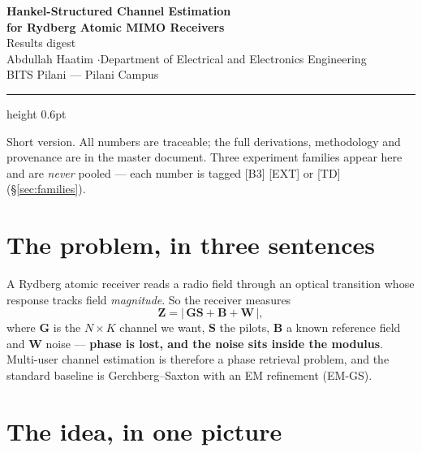 \documentclass[11pt]{article}
\newcommand{\famtag}[1]{{\footnotesize\textcolor{tag}{[#1]}}}
\newcommand{\bG}{\mathbf{G}}
\newcommand{\bS}{\mathbf{S}}
\newcommand{\bB}{\mathbf{B}}
\newcommand{\bW}{\mathbf{W}}
\newcommand{\bZ}{\mathbf{Z}}
\begin{document}
\begin{center}
{\LARGE\bfseries Hankel-Structured Channel Estimation}\\[3pt]
{\LARGE\bfseries for Rydberg Atomic MIMO Receivers}\\[8pt]
{\large Results digest}\\[6pt]
{\normalsize Abdullah Haatim \quad$\cdot$\quad Department of Electrical and
Electronics Engineering}\\
{\normalsize BITS Pilani --- Pilani Campus}
\end{center}

\vspace{2pt}
\hrule height 0.6pt
\vspace{10pt}

{\small
Short version. All numbers are traceable; the full derivations, methodology and
provenance are in the master document. Three experiment families appear here
and are \emph{never} pooled --- each number is tagged \famtag{B3} \famtag{EXT} or
\famtag{TD} (\S\ref{sec:families}).
\par}

\vspace{6pt}

\section{The problem, in three sentences}

A Rydberg atomic receiver reads a radio field through an optical transition
whose response tracks field \emph{magnitude}. So the receiver measures
\begin{equation*}
\bZ = \bigl|\,\bG\bS + \bB + \bW\,\bigr|,
\end{equation*}
where $\bG$ is the $N\times K$ channel we want, $\bS$ the pilots, $\bB$ a known
reference field and $\bW$ noise --- \textbf{phase is lost, and the noise sits
inside the modulus}. Multi-user channel estimation is therefore a phase
retrieval problem, and the standard baseline is Gerchberg--Saxton with an EM
refinement (EM-GS).

\section{The idea, in one picture}
\end{document}
